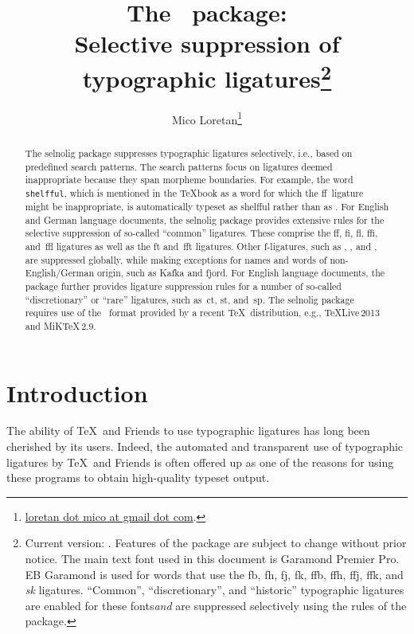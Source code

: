 \documentclass[11pt]{article}
\title{The \selnoligpackagename\ package: \\
Selective suppression of typographic ligatures\thanks{ 
Current version: \selnoligpackageversion. Features of the \pkg{selnolig} package are subject to change without prior notice. 
\newline\hspace*{\parindent}
The main text font used in this document is Garamond Premier Pro. {\ebg EB Garamond} is used for words that use the {\ebg fb, fh, fj, fk, ffb, ffh, ffj, ffk, and \emph{sk}} ligatures. \enquote{Common}, \enquote{discretionary}, and \enquote{historic} typographic ligatures are enabled for these fonts\textemdash \emph{and} are suppressed selectively using the rules of the \pkg{selnolig} package.} }
\author{Mico Loretan\thanks{
\href{mailto:loretan.mico@gmail.com}{loretan dot mico at gmail dot com}.}}
\date{\selnoligpackagedate}
\newcommand{\pkg}[1]{\textsf{#1}}
\newcommand{\opt}[1]{\texttt{#1}}
\begin{document}
\VerbatimFootnotes
{}

\selnoligoff
\maketitle
\selnoligon

\begin{abstract}

The \pkg{selnolig} package suppresses typographic ligatures selectively, i.e., based on predefined search patterns. The search patterns focus on ligatures deemed inappropriate because they span morpheme boundaries. For example, the word \opt{shelfful}, which is mentioned in the \TeX book as a word for which the ff~ligature might be inappropriate, is automatically typeset as shelfful rather than as .
\newline\hspace*{\parindent}
For English and German language documents, the \pkg{selnolig} package provides extensive rules for the selective suppression of so-called \enquote{common} ligatures. These comprise the ff, fi, fl, ffi, and~ffl ligatures as well as the ft and~fft ligatures. Other f-ligatures, such as {\ebg{}}, {\ebg{}}, {\ebg{}} and {\ebg{}}, are suppressed globally, while making exceptions for names and words of non-English/German origin, such as {\ebg Kafka} and {\ebg fjord}.
\newline\hspace*{\parindent}
For English language documents, the package further provides ligature suppression rules for a number of so-called \enquote{discretionary} or \enquote{rare} ligatures, such as~ct, st, and~sp.
\newline\hspace*{\parindent}
The \pkg{selnolig} package requires use of the \LuaLaTeX\ format provided by a recent \TeX\ distribution, e.g., \TeX Live\,2013 and MiK\TeX\,2.9.
\end{abstract}

\tableofcontents

\clearpage
{}

\section{Introduction}

The ability of \TeX\ and Friends to use typographic ligatures has long been cherished by its users. Indeed, the automated and transparent use of typographic ligatures by \TeX\ and Friends is often offered up as one of the reasons for using these programs to obtain high-quality typeset output.
\end{document}
